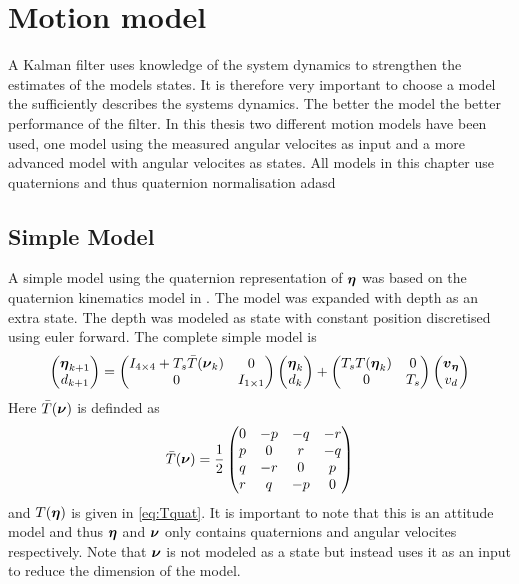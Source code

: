 \section{Motion model}
A Kalman filter uses knowledge of the system dynamics to strengthen the estimates of the models states. It is therefore very important to choose a model the sufficiently describes the systems dynamics. The better the model the better performance of the filter. In this thesis two different motion models have been used, one model using the measured angular velocites as input and a more advanced model with angular velocites as states. All models in this chapter use quaternions and thus quaternion normalisation    adasd

\subsection{Simple Model}\label{sec:simple_model}
A simple model using the quaternion representation of $\boldsymbol{\eta}$ was based on the quaternion kinematics model in \citet[p.47]{Tornqvist}. The model was expanded with depth as an extra state. The depth was modeled as state with constant position discretised using euler forward. The complete simple model is 
\begin{equation}
\begin{pmatrix}
\boldsymbol{\eta}_{k+1}\\
d_{k+1}
\end{pmatrix} 
=
 \begin{pmatrix}
 I_{4\times4} + T_s \bar{T}(\boldsymbol{\nu}_k) & 0\\
 0 & I_{1\times1} 
 \end{pmatrix}
 \begin{pmatrix}
 \boldsymbol{\eta}_{k}\\
 d_k
 \end{pmatrix}
 +
  \begin{pmatrix}
  T_s T(\boldsymbol{\eta}_{k}) & 0\\
  0 & T_s
  \end{pmatrix}
  \begin{pmatrix}
  \boldsymbol{v}_{\boldsymbol{\eta}}\\
  v_d 
  \end{pmatrix}
\end{equation}
Here $\bar{T}(\boldsymbol{\nu})$ is definded as
\begin{equation}
\bar{T}(\boldsymbol{\nu}) = \frac{1}{2}
\begin{pmatrix}
     0 &-p &-q &-r\\
     p & 0 & r &-q\\
     q &-r & 0 & p\\
     r & q &-p & 0
\end{pmatrix}
\end{equation} and $T(\boldsymbol{\eta})$ is given in \eqref{eq:Tquat}.
It is important to note that this is an attitude model and thus $\boldsymbol{\eta}$ and $\boldsymbol{\nu}$ only contains quaternions and angular velocites respectively. Note that $\boldsymbol{\nu}$ is not modeled as a state but \citet{Tornqvist} instead uses it as an input to reduce the dimension of the model. 
